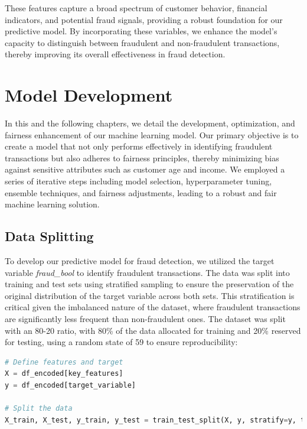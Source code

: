\documentclass[12pt,a4paper]{report}
\begin{document}
These features capture a broad spectrum of customer behavior, financial indicators, and potential fraud signals, providing a robust foundation for our predictive model. By incorporating these variables, we enhance the model's capacity to distinguish between fraudulent and non-fraudulent transactions, thereby improving its overall effectiveness in fraud detection.\\







\chapter{Model Development}

In this and the following chapters, we detail the development, optimization, and fairness enhancement of our machine learning model. Our primary objective is to create a model that not only performs effectively in identifying fraudulent transactions but also adheres to fairness principles, thereby minimizing bias against sensitive attributes such as customer age and income. We employed a series of iterative steps including model selection, hyperparameter tuning, ensemble techniques, and fairness adjustments, leading to a robust and fair machine learning solution.\\

\section{Data Splitting}

To develop our predictive model for fraud detection, we utilized the target variable \textit{fraud\_bool} to identify fraudulent transactions. The data was split into training and test sets using stratified sampling to ensure the preservation of the original distribution of the target variable across both sets. This stratification is critical given the imbalanced nature of the dataset, where fraudulent transactions are significantly less frequent than non-fraudulent ones. The dataset was split with an 80-20 ratio, with 80\% of the data allocated for training and 20\% reserved for testing, using a random state of 59 to ensure reproducibility:\\

\begin{lstlisting}[language=Python, caption={Feature Definition and Data Splitting}]
# Define features and target
X = df_encoded[key_features]
y = df_encoded[target_variable]

# Split the data
X_train, X_test, y_train, y_test = train_test_split(X, y, stratify=y, test_size=0.2, random_state=59)
\end{lstlisting}
\end{document}
